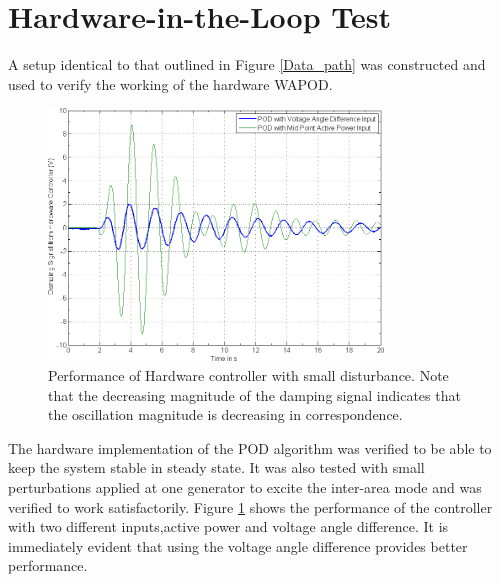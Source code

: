 \documentclass[conference]{IEEEtran}
\begin{document}
\section{Hardware-in-the-Loop Test} \label{HILtest}
A setup identical to that outlined in Figure \ref{Data_path} was constructed and used to verify the working of the hardware WAPOD. %
\begin{figure}[H]
\centering
\includegraphics[width=3.5in]{Results.png} 
\vspace{-0.5em}
\caption{Performance of Hardware controller with small disturbance. Note that the decreasing magnitude of the damping signal indicates that the oscillation magnitude is decreasing in correspondence.}
\label{Results}
\end{figure}
The hardware implementation of the POD algorithm was verified to be able to keep the system stable in steady state. It was also tested with small perturbations applied at one generator to excite the inter-area mode and was verified to work satisfactorily. Figure \ref{Results} shows the performance of the controller with two different inputs,active power and voltage angle difference. It is immediately evident that using the voltage angle difference provides better performance. %
\end{document}
